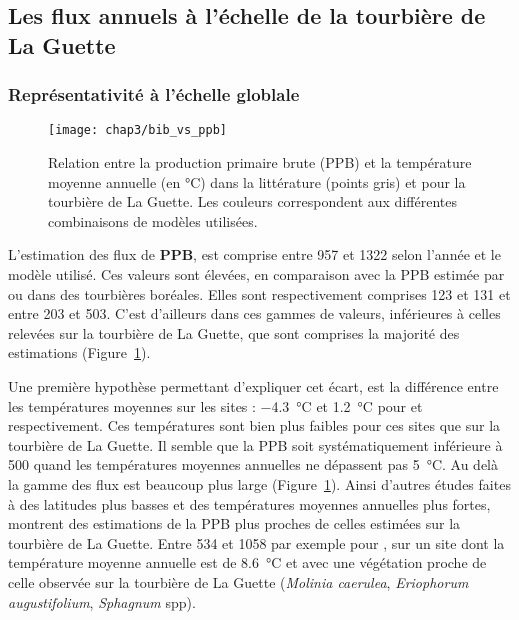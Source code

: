 \subsection{Les flux annuels à l'échelle de la tourbière de La Guette}

\subsubsection{Représentativité à l'échelle globlale}

\begin{figure}
\centering
\texttt{[image: chap3/bib\_vs\_ppb]}
\caption{Relation entre la production primaire brute (PPB) et la température moyenne annuelle (en °C) dans la littérature (points gris) et pour la tourbière de La Guette. Les couleurs correspondent aux différentes combinaisons de modèles utilisées.}
\label{fig:bib_vs_ppb}
\end{figure}

L'estimation des flux de \textbf{PPB}, est comprise entre 957 et \SI{1322}{\gcma} selon l'année et le modèle utilisé.
Ces valeurs sont élevées, en comparaison avec la PPB estimée par  \citet{trudeau2014} ou \citet{peichl2014} dans des tourbières boréales.
Elles sont respectivement comprises  123 et \SI{131}{\gcma} et entre 203 et \SI{503}{\gcma}.
C'est d'ailleurs dans ces gammes de valeurs, inférieures à celles relevées sur la tourbière de La Guette, que sont comprises la majorité des estimations (Figure~\ref{fig:bib_vs_ppb}).


Une première hypothèse permettant d'expliquer cet écart, est la différence entre les températures moyennes sur les sites :
\SI{-4.3}{\degreeCelsius} et \SI{1.2}{\degreeCelsius} pour \citet{trudeau2014} et \citet{peichl2014} respectivement.
Ces températures sont bien plus faibles pour ces sites que sur la tourbière de La Guette.
Il semble que la PPB soit systématiquement inférieure à \SI{500}{\gcma} quand les températures moyennes annuelles ne dépassent pas \SI{5}{\degreeCelsius}. 
Au delà la gamme des flux est beaucoup plus large (Figure~\ref{fig:bib_vs_ppb}).
Ainsi d'autres études faites à des latitudes plus basses et des températures moyennes annuelles plus fortes, montrent des estimations de la PPB plus proches de celles estimées sur la tourbière de La Guette.
Entre 534 et \SI{1058}{\gcma} par exemple pour \citet{beyer2015}, sur un site dont la température moyenne annuelle est de \SI{8.6}{\degreeCelsius} et avec une végétation proche de celle observée sur la tourbière de La Guette (\textit{Molinia caerulea}, \textit{Eriophorum augustifolium}, \textit{Sphagnum} spp).


